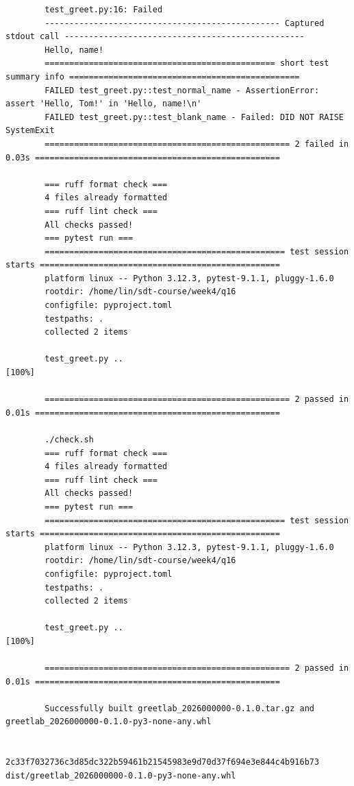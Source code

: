 \documentclass[a4paper,12pt]{ctexart}
\begin{document}
\begin{lstlisting}
		test_greet.py:16: Failed
		------------------------------------------------ Captured stdout call -------------------------------------------------
		Hello, name!
		=============================================== short test summary info ===============================================
		FAILED test_greet.py::test_normal_name - AssertionError: assert 'Hello, Tom!' in 'Hello, name!\n'
		FAILED test_greet.py::test_blank_name - Failed: DID NOT RAISE SystemExit
		================================================== 2 failed in 0.03s ==================================================
		
		=== ruff format check ===
		4 files already formatted
		=== ruff lint check ===
		All checks passed!
		=== pytest run ===
		================================================= test session starts =================================================
		platform linux -- Python 3.12.3, pytest-9.1.1, pluggy-1.6.0
		rootdir: /home/lin/sdt-course/week4/q16
		configfile: pyproject.toml
		testpaths: .
		collected 2 items                                                                                                     
		
		test_greet.py ..                                                                                                [100%]
		
		================================================== 2 passed in 0.01s ==================================================
		
		./check.sh
		=== ruff format check ===
		4 files already formatted
		=== ruff lint check ===
		All checks passed!
		=== pytest run ===
		================================================= test session starts =================================================
		platform linux -- Python 3.12.3, pytest-9.1.1, pluggy-1.6.0
		rootdir: /home/lin/sdt-course/week4/q16
		configfile: pyproject.toml
		testpaths: .
		collected 2 items                                                                                                     
		
		test_greet.py ..                                                                                                [100%]
		
		================================================== 2 passed in 0.01s ==================================================
		
		Successfully built greetlab_2026000000-0.1.0.tar.gz and greetlab_2026000000-0.1.0-py3-none-any.whl
		
		2c33f7032736c3d85dc322b59461b21545983e9d70d37f694e3e844c4b916b73  dist/greetlab_2026000000-0.1.0-py3-none-any.whl
	\end{lstlisting}
	
\end{document}
